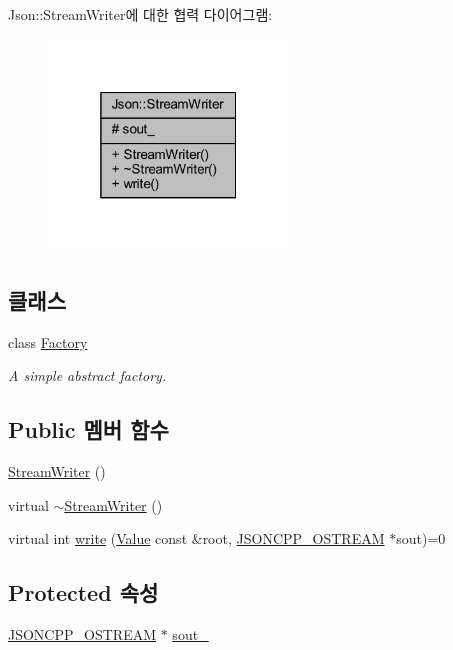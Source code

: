 Json\+:\+:Stream\+Writer에 대한 협력 다이어그램\+:\nopagebreak
\begin{figure}[H]
\begin{center}
\leavevmode
\includegraphics[width=181pt]{class_json_1_1_stream_writer__coll__graph}
\end{center}
\end{figure}
\subsection*{클래스}
\begin{DoxyCompactItemize}
\item 
class \hyperlink{class_json_1_1_stream_writer_1_1_factory}{Factory}
\begin{DoxyCompactList}\small\item\em A simple abstract factory. \end{DoxyCompactList}\end{DoxyCompactItemize}
\subsection*{Public 멤버 함수}
\begin{DoxyCompactItemize}
\item 
\hyperlink{class_json_1_1_stream_writer_a66e6f5113618ce6b04cac9b3c85a3707}{Stream\+Writer} ()
\item 
virtual \hyperlink{class_json_1_1_stream_writer_a03f8fb6a873b6b50f05bc4556e043c3a}{$\sim$\+Stream\+Writer} ()
\item 
virtual int \hyperlink{class_json_1_1_stream_writer_a84278bad0c9a9fc587bc2a97c5bb5993}{write} (\hyperlink{class_json_1_1_value}{Value} const \&root, \hyperlink{json_8h_a37a25be5fca174927780caeb280094ce}{J\+S\+O\+N\+C\+P\+P\+\_\+\+O\+S\+T\+R\+E\+AM} $\ast$sout)=0
\end{DoxyCompactItemize}
\subsection*{Protected 속성}
\begin{DoxyCompactItemize}
\item 
\hyperlink{json_8h_a37a25be5fca174927780caeb280094ce}{J\+S\+O\+N\+C\+P\+P\+\_\+\+O\+S\+T\+R\+E\+AM} $\ast$ \hyperlink{class_json_1_1_stream_writer_a4f5603d4228a9fa46a42cb44e5234d9b}{sout\+\_\+}
\end{DoxyCompactItemize}


